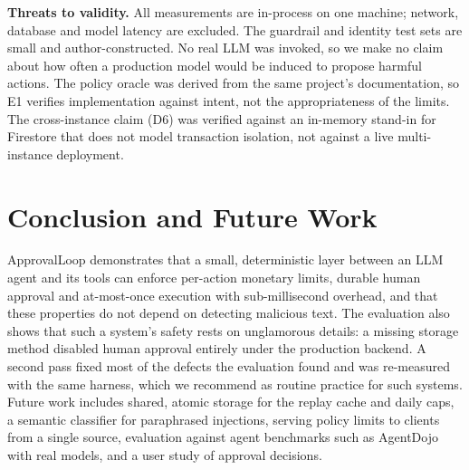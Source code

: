 \documentclass[conference]{IEEEtran}
\begin{document}
\textbf{Threats to validity.} All measurements are in-process on one machine; network, database and model latency are excluded. The guardrail and identity test sets are small and author-constructed. No real LLM was invoked, so we make no claim about how often a production model would be induced to propose harmful actions. The policy oracle was derived from the same project's documentation, so E1 verifies implementation against intent, not the appropriateness of the limits. The cross-instance claim (D6) was verified against an in-memory stand-in for Firestore that does not model transaction isolation, not against a live multi-instance deployment.

\section{Conclusion and Future Work}
ApprovalLoop demonstrates that a small, deterministic layer between an LLM agent and its tools can enforce per-action monetary limits, durable human approval and at-most-once execution with sub-millisecond overhead, and that these properties do not depend on detecting malicious text. The evaluation also shows that such a system's safety rests on unglamorous details: a missing storage method disabled human approval entirely under the production backend. A second pass fixed most of the defects the evaluation found and was re-measured with the same harness, which we recommend as routine practice for such systems. Future work includes shared, atomic storage for the replay cache and daily caps, a semantic classifier for paraphrased injections, serving policy limits to clients from a single source, evaluation against agent benchmarks such as AgentDojo \cite{debenedetti2024agentdojo} with real models, and a user study of approval decisions.
\end{document}
